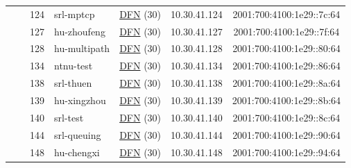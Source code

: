 \begin{small}
\begin{center}
\begin{longtable}{|c|c|c|c|c|c|c|c|}
  &  & \tiny{124} & \multicolumn{1}{|l|}{\tiny{srl-mptcp}} & \multicolumn{2}{|c|}{\tiny{\href{https://www.dfn.de}{DFN} (30)}} & \tiny{10.30.41.124} & \tiny{2001:700:4100:1e29::7c:64} \\* \cline{3-3}\cline{4-4}\cline{5-5}\cline{6-6}\cline{7-7}\cline{8-8}
  &  & \tiny{127} & \multicolumn{1}{|l|}{\tiny{hu-zhoufeng}} & \multicolumn{2}{|c|}{\tiny{\href{https://www.dfn.de}{DFN} (30)}} & \tiny{10.30.41.127} & \tiny{2001:700:4100:1e29::7f:64} \\* \cline{3-3}\cline{4-4}\cline{5-5}\cline{6-6}\cline{7-7}\cline{8-8}
  &  & \tiny{128} & \multicolumn{1}{|l|}{\tiny{hu-multipath}} & \multicolumn{2}{|c|}{\tiny{\href{https://www.dfn.de}{DFN} (30)}} & \tiny{10.30.41.128} & \tiny{2001:700:4100:1e29::80:64} \\* \cline{3-3}\cline{4-4}\cline{5-5}\cline{6-6}\cline{7-7}\cline{8-8}
  &  & \tiny{134} & \multicolumn{1}{|l|}{\tiny{ntnu-test}} & \multicolumn{2}{|c|}{\tiny{\href{https://www.dfn.de}{DFN} (30)}} & \tiny{10.30.41.134} & \tiny{2001:700:4100:1e29::86:64} \\* \cline{3-3}\cline{4-4}\cline{5-5}\cline{6-6}\cline{7-7}\cline{8-8}
  &  & \tiny{138} & \multicolumn{1}{|l|}{\tiny{srl-thuen}} & \multicolumn{2}{|c|}{\tiny{\href{https://www.dfn.de}{DFN} (30)}} & \tiny{10.30.41.138} & \tiny{2001:700:4100:1e29::8a:64} \\* \cline{3-3}\cline{4-4}\cline{5-5}\cline{6-6}\cline{7-7}\cline{8-8}
  &  & \tiny{139} & \multicolumn{1}{|l|}{\tiny{hu-xingzhou}} & \multicolumn{2}{|c|}{\tiny{\href{https://www.dfn.de}{DFN} (30)}} & \tiny{10.30.41.139} & \tiny{2001:700:4100:1e29::8b:64} \\* \cline{3-3}\cline{4-4}\cline{5-5}\cline{6-6}\cline{7-7}\cline{8-8}
  &  & \tiny{140} & \multicolumn{1}{|l|}{\tiny{srl-test}} & \multicolumn{2}{|c|}{\tiny{\href{https://www.dfn.de}{DFN} (30)}} & \tiny{10.30.41.140} & \tiny{2001:700:4100:1e29::8c:64} \\* \cline{3-3}\cline{4-4}\cline{5-5}\cline{6-6}\cline{7-7}\cline{8-8}
  &  & \tiny{144} & \multicolumn{1}{|l|}{\tiny{srl-queuing}} & \multicolumn{2}{|c|}{\tiny{\href{https://www.dfn.de}{DFN} (30)}} & \tiny{10.30.41.144} & \tiny{2001:700:4100:1e29::90:64} \\* \cline{3-3}\cline{4-4}\cline{5-5}\cline{6-6}\cline{7-7}\cline{8-8}
  &  & \tiny{148} & \multicolumn{1}{|l|}{\tiny{hu-chengxi}} & \multicolumn{2}{|c|}{\tiny{\href{https://www.dfn.de}{DFN} (30)}} & \tiny{10.30.41.148} & \tiny{2001:700:4100:1e29::94:64} \\* \cline{3-3}\cline{4-4}\cline{5-5}\cline{6-6}\cline{7-7}\cline{8-8}

\end{longtable}
\end{center}
\end{small}
